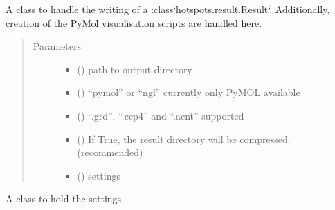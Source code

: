 \documentclass[letterpaper,10pt,english]{sphinxmanual}
\begin{document}
\begin{fulllineitems}
\label{\detokenize{hs_io_api:hotspots.hs_io.HotspotWriter}}
A class to handle the writing of a :class{}`hotspots.result.Result{}`. Additionally, creation of the
PyMol visualisation scripts are handled here.
\begin{quote}\begin{description}
\item[{Parameters}] \leavevmode\begin{itemize}
\item {} 
 () \textendash{} path to output directory

\item {} 
 () \textendash{} “pymol” or “ngl” currently only PyMOL available

\item {} 
 () \textendash{} “.grd”, “.ccp4” and “.acnt” supported

\item {} 
 () \textendash{} If True, the result directory will be compressed. (recommended)

\item {} 
 ({\hyperref[\detokenize{hs_io_api:hotspots.hs_io.HotspotWriter.Settings}]{}}) \textendash{} settings

\end{itemize}

\end{description}\end{quote}

\begin{fulllineitems}
\label{\detokenize{hs_io_api:hotspots.hs_io.HotspotWriter.Settings}}
A class to hold the {\hyperref[\detokenize{hs_io_api:hotspots.hs_io.HotspotWriter}]{}} settings


\end{fulllineitems}
\end{fulllineitems}
\end{document}
